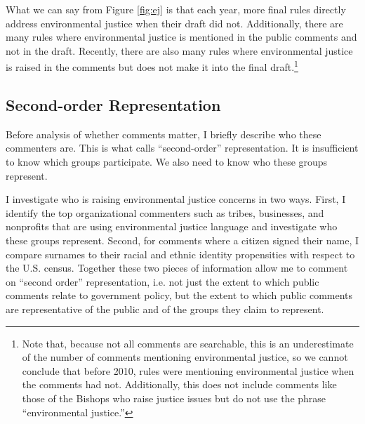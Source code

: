 What we can say from Figure  \ref{fig:ej}  is that each year, more final rules directly address environmental justice when their draft did not. Additionally, there are many rules where environmental justice is mentioned in the public comments and not in the draft. Recently, there are also many rules where environmental justice is raised in the comments but does not make it into the final draft.\footnote{Note that, because not all comments are searchable, this is an underestimate of the number of comments mentioning environmental justice, so we cannot conclude that before 2010, rules were mentioning environmental justice when the comments had not. Additionally, this does not include comments like those of the Bishops who raise justice issues but do not use the phrase ``environmental justice.''} 


\subsection{Second-order Representation} Before analysis of whether comments matter, I briefly describe who these commenters are. This is what \citet{Seifter2016UCLA} calls ``second-order'' representation. It is insufficient to know which groups participate. We also need to know who these groups represent.

I  investigate who is raising environmental justice concerns in two ways. First, I  identify the top organizational commenters such as tribes, businesses, and nonprofits that are using environmental justice language and investigate who these groups represent. Second, for comments where a citizen signed their name, I  compare surnames to their racial and ethnic identity propensities with respect to the U.S. census. Together these two pieces of information allow me to comment on ``second order'' representation, i.e. not just the extent to which public comments relate to government policy, but the extent to which public comments are representative of the public and of the groups they claim to represent. 



